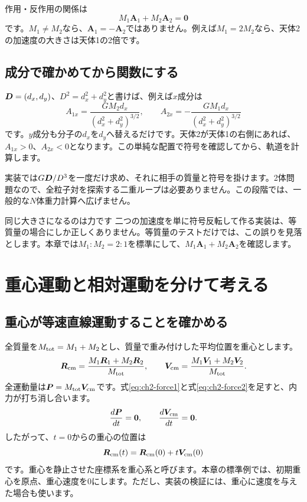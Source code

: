 作用・反作用の関係は
\begin{equation}
M_1\boldsymbol A_1+M_2\boldsymbol A_2=\boldsymbol 0
\label{eq:ch2-force-balance}
\end{equation}
です。$M_1\ne M_2$なら、$\boldsymbol A_1=-\boldsymbol A_2$ではありません。例えば$M_1=2M_2$なら、天体2の加速度の大きさは天体1の2倍です。

\subsection{成分で確かめてから関数にする}
$\boldsymbol D=(d_x,d_y)$、$D^2=d_x^2+d_y^2$と書けば、例えば$x$成分は
\begin{equation}
A_{1x}=\frac{GM_2d_x}{(d_x^2+d_y^2)^{3/2}},\qquad
A_{2x}=-\frac{GM_1d_x}{(d_x^2+d_y^2)^{3/2}}
\label{eq:ch2-acceleration-components}
\end{equation}
です。$y$成分も分子の$d_x$を$d_y$へ替えるだけです。天体2が天体1の右側にあれば、$A_{1x}>0$、$A_{2x}<0$となります。この単純な配置で符号を確認してから、軌道を計算します。

実装では$G\boldsymbol D/D^3$を一度だけ求め、それに相手の質量と符号を掛けます。2体問題なので、全粒子対を探索する二重ループは必要ありません。この段階では、一般的な$N$体重力計算へ広げません。

\begin{failbox}{同じ大きさになるのは力です}
二つの加速度を単に符号反転して作る実装は、等質量の場合にしか正しくありません。等質量のテストだけでは、この誤りを見落とします。本章では$M_1:M_2=2:1$を標準にして、$M_1\boldsymbol A_1+M_2\boldsymbol A_2$を確認します。
\end{failbox}

\section{重心運動と相対運動を分けて考える}
\label{sec:ch2-cm}
\subsection{重心が等速直線運動することを確かめる}
全質量を$M_{\rm tot}=M_1+M_2$とし、質量で重み付けした平均位置を重心とします。
\begin{equation}
\boldsymbol R_{\rm cm}=\frac{M_1\boldsymbol R_1+M_2\boldsymbol R_2}{M_{\rm tot}},\qquad
\boldsymbol V_{\rm cm}=\frac{M_1\boldsymbol V_1+M_2\boldsymbol V_2}{M_{\rm tot}}.
\label{eq:ch2-cm-def}
\end{equation}
全運動量は$\boldsymbol P=M_{\rm tot}\boldsymbol V_{\rm cm}$です。式\eqref{eq:ch2-force1}と式\eqref{eq:ch2-force2}を足すと、内力が打ち消し合います。
\begin{equation}
\frac{d\boldsymbol P}{dt}=\boldsymbol 0,\qquad
\frac{d\boldsymbol V_{\rm cm}}{dt}=\boldsymbol 0.
\label{eq:ch2-momentum-conservation}
\end{equation}
したがって、$t=0$からの重心の位置は
\begin{equation}
\boldsymbol R_{\rm cm}(t)=\boldsymbol R_{\rm cm}(0)+t\boldsymbol V_{\rm cm}(0)
\label{eq:ch2-cm-motion}
\end{equation}
です。重心を静止させた座標系を重心系と呼びます。本章の標準例では、初期重心を原点、重心速度を0にします。ただし、実装の検証には、重心に速度を与えた場合も使います。

